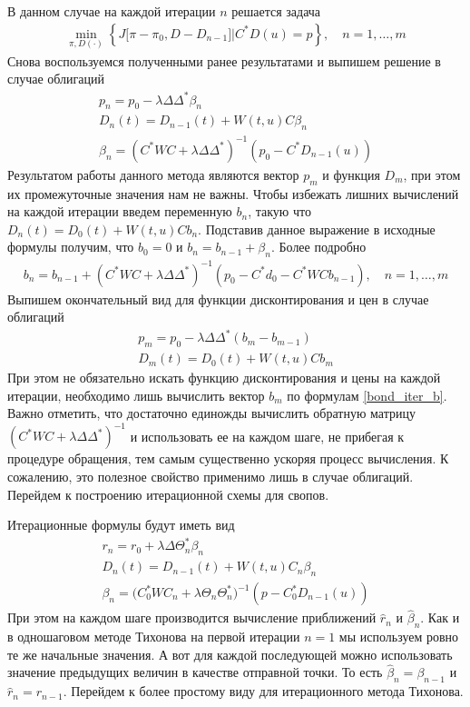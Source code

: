 \documentclass[10pt]{article}
\theoremstyle{definition}
\theoremstyle{remark}
\theoremstyle{plain}
\begin{document}
\begin{itemize}
В данном случае на каждой итерации $n$ решается задача
\begin{align*}
\min\limits_{\pi,D(\cdot)}
\left\{
	J\bigl[\pi-\pi_0,D - D_{n-1}\bigr]
	\Big|
	C^*D(u) = p 
\right\}, \quad n=1,\ldots,m
\end{align*}
Снова воспользуемся полученными ранее результатами и выпишем решение в случае  облигаций
\begin{gather*}
p_n = p_0 - \lambda\Delta\Delta^*\beta_n
\\
D_n(t) = D_{n-1}(t) + W(t,u)C\beta_n
\\
\beta_n = \left(C^*WC+\lambda\Delta\Delta^*\right)^{-1}\left(p_0 - C^*D_{n-1}(u)\right)
\end{gather*}
Результатом работы данного метода являются вектор $p_m$ и функция $D_m$, при этом их промежуточные значения нам не важны.
Чтобы избежать лишних вычислений на каждой итерации введем переменную $b_n$, такую что $D_n(t) = D_0(t)+ W(t,u)C b_n$. Подставив данное выражение в исходные формулы получим, что $b_0 = 0$ и $b_n = b_{n-1} + \beta_n$. Более подробно 
\begin{align}
b_n = b_{n-1}+ \left(C^*WC+\lambda\Delta\Delta^*\right)^{-1}\left(p_0 - C^*d_0 - C^*WCb_{n-1}\right),
\quad n=1,\ldots, m \label{bond_iter_b}
\end{align}
Выпишем окончательный вид для функции дисконтирования и цен в случае облигаций
\begin{gather*}
p_m = p_0 - \lambda\Delta\Delta^*(b_m - b_{m-1})\\
D_m(t) = D_0(t) + W(t,u)C b_m
\end{gather*}
При этом не обязательно искать функцию дисконтирования и цены на каждой итерации, необходимо лишь вычислить вектор $b_m$ по формулам \eqref{bond_iter_b}. Важно отметить, что достаточно единожды вычислить обратную матрицу $\left(C^*WC+\lambda\Delta\Delta^*\right)^{-1}$ и использовать ее на каждом шаге, не прибегая к процедуре обращения, тем самым существенно ускоряя процесс вычисления. К сожалению, это полезное свойство применимо лишь в случае облигаций. Перейдем к построению итерационной схемы для свопов.

Итерационные формулы будут иметь вид
\begin{gather*}
r_n = r_0 + \lambda\Delta\Theta_n^*\beta_n
\\
D_n(t) = D_{n-1}(t) + W(t,u)C_n\beta_n
\\
\beta_n = \bigl(C_0^*WC_n+\lambda\Theta_n\Theta_n^*\bigr)^{-1}\left(p - C_0^*D_{n-1}(u)\right)
\end{gather*}
При этом на каждом шаге производится вычисление приближений $\hat{r}_n$ и $\hat{\beta}_n$. Как и в одношаговом методе Тихонова на первой итерации  $n = 1$ мы используем ровно те же начальные значения. А вот для каждой последующей можно использовать значение предыдущих величин в качестве отправной точки. То есть $\hat{\beta}_n = \beta_{n-1}$ и $\hat{r}_n = r_{n-1}$. Перейдем к более простому виду для итерационного метода Тихонова.


\end{itemize}
\end{document}
